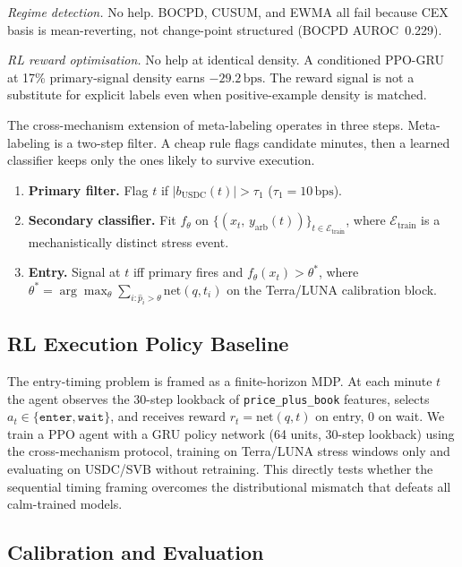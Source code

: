 \documentclass[sigconf,anonymous,natbib=false]{acmart}
\newcommand{\bps}{\,\text{bps}}
\begin{document}
\textit{Regime detection.} No help.
BOCPD, CUSUM, and EWMA all fail because CEX basis is mean-reverting,
not change-point structured (BOCPD AUROC~0.229).

\textit{RL reward optimisation.} No help at identical density.
A conditioned PPO-GRU at 17\% primary-signal density earns
$-29.2\bps$. The reward signal is not a substitute for explicit
labels even when positive-example density is matched.

The cross-mechanism extension of meta-labeling operates in three steps.
Meta-labeling \cite{lopezdeprado2018} is a two-step filter. A cheap
rule flags candidate minutes, then a learned classifier keeps only the
ones likely to survive execution.
\begin{enumerate}[leftmargin=*,itemsep=1pt,topsep=2pt]
  \item \textbf{Primary filter.} Flag $t$ if
        $|b_{\text{USDC}}(t)|>\tau_1$ ($\tau_1{=}10\bps$).
  \item \textbf{Secondary classifier.} Fit $f_\theta$ on
        $\{(x_t,\,y_{\text{arb}}(t))\}_{t\in\mathcal{E}_{\text{train}}}$,
        where $\mathcal{E}_{\text{train}}$ is a mechanistically distinct
        stress event.
  \item \textbf{Entry.} Signal at $t$ iff primary fires
        and $f_\theta(x_t)>\theta^*$, where
        $\theta^* = \arg\max_\theta \sum_{i:\hat{p}_i>\theta}
        \text{net}(q,t_i)$ on the Terra/LUNA calibration block.
\end{enumerate}

\subsection{RL Execution Policy Baseline}
\label{sec:rl_baseline}

The entry-timing problem is framed as a finite-horizon MDP.
At each minute $t$ the agent observes the 30-step lookback of
\texttt{price\_plus\_book} features, selects
$a_t \in \{\texttt{enter},\texttt{wait}\}$, and receives reward
$r_t = \text{net}(q,t)$ on entry, 0 on wait.
We train a PPO agent with a GRU policy network (64 units, 30-step
lookback) using the cross-mechanism protocol, training on Terra/LUNA
stress windows only and evaluating on USDC/SVB without retraining.
This directly tests whether the sequential timing framing overcomes
the distributional mismatch that defeats all calm-trained models.

\subsection{Calibration and Evaluation}
\label{sec:eval}
\end{document}
